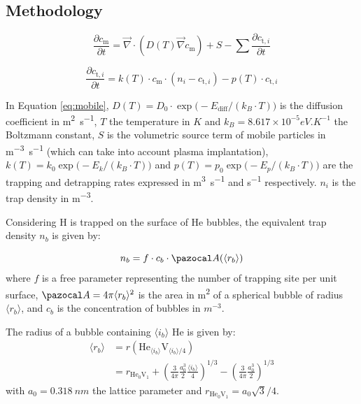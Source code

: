 \subsection{Methodology}

\begin{equation}
    \frac{\partial c_\mathrm{m}}{\partial t}=\vec{\nabla} \cdot\left(D(T) \vec{\nabla}c_\mathrm{m}\right)+S-\sum \frac{\partial c_{\mathrm{t}, i}}{\partial t}
    \label{eq:mobile_ch5}
\end{equation}

\begin{equation}
    \frac{\partial c_{\mathrm{t}, i}}{\partial t}=k(T) \cdot c_\mathrm{m} \cdot\left(n_{i}-c_{\mathrm{t}, i}\right)-p(T) \cdot c_{\mathrm{t}, i}
    \label{eq:trapped_ch5}
\end{equation}

In Equation \ref{eq:mobile}, ${D(T)=D_0 \cdot \exp\big(-E_\mathrm{diff}/ (k_B \cdot T )\big)}$ is the diffusion coefficient in \si{m^2.s^{-1}}, $T$ the temperature in $\si{K}$ and ${k_B = 8.617 \times 10^{-5} \si{eV.K^{-1}}}$ the Boltzmann constant, $S$ is the volumetric source term of mobile particles in \si{m^{-3}.s^{-1}} (which can take into account plasma implantation), $k(T)=k_0\exp{\big(-E_{k} / (k_B \cdot T ) \big)}$ and $p(T)=p_0\exp{\big(-E_{p}/ (k_B \cdot T )\big)}$ are the trapping and detrapping rates expressed in \si{m^3.s^{-1}} and \si{s^{-1}} respectively.
$n_i$ is the trap density in \si{m^{-3}}.

Considering H is trapped on the surface of He bubbles, the equivalent trap density $n_b$ is given by:

\begin{equation}
    n_b = f \cdot c_b \cdot \Ab(\langle r_b \rangle)
\end{equation}
where $f$ is a free parameter representing the number of trapping site per unit surface, $\Ab = 4\pi \langle r_b \rangle^2$ is the area in \si{m^2} of a spherical bubble of radius $\langle r_b \rangle$, and $c_b$ is the concentration of bubbles in $\si{m^{-3}}$.


The radius of a bubble containing $\langle i_b \rangle$ He is given by:
\begin{equation}
    \begin{split}
        \langle r_b \rangle &= r(\mathrm{He}_{\langle i_b \rangle}\mathrm{V}_{\langle i_b \rangle/4}) \\
        &= r_{\mathrm{He}_0 \mathrm{V}_1} + \left(\frac{3}{4 \pi} \frac{a_0^3}{2} \frac{\langle i_b \rangle}{4} \right)^{1/3} - \left(\frac{3}{4 \pi} \frac{a_0^3}{2} \right)^{1/3}
    \end{split}
    \label{eq: radius average}
\end{equation}
with $a_0 = \SI{0.318}{nm}$ the lattice parameter and $r_{\mathrm{He}_0 \mathrm{V}_1} =  a_0 \sqrt{3}/4$.



